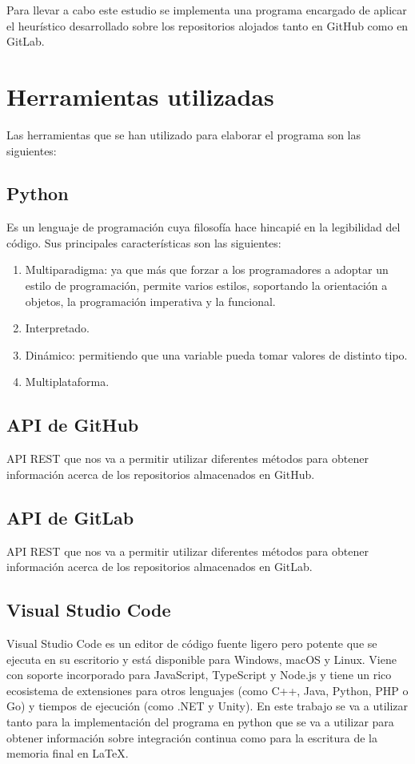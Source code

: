 Para llevar a cabo este estudio se implementa una programa encargado de aplicar el heurístico desarrollado sobre los repositorios alojados tanto en GitHub como en GitLab.

\section{Herramientas utilizadas}
Las herramientas que se han utilizado para elaborar el programa son las siguientes:
\subsection{Python}
Es un lenguaje de programación cuya filosofía hace hincapié en la legibilidad del código. Sus principales características son las siguientes:
\begin{enumerate}
    \item Multiparadigma: ya que más que forzar a los programadores a adoptar un estilo de programación, permite varios estilos, soportando la orientación a objetos, la programación imperativa y la funcional.
    \item Interpretado.
    \item Dinámico: permitiendo que una variable pueda tomar valores de distinto tipo.
    \item Multiplataforma.
\end{enumerate}

\subsection{API de GitHub}
API REST que nos va a permitir utilizar diferentes métodos para obtener información acerca de los repositorios almacenados en GitHub.

\subsection{API de GitLab}
API REST que nos va a permitir utilizar diferentes métodos para obtener información acerca de los repositorios almacenados en GitLab.

\subsection{Visual Studio Code}
Visual Studio Code es un editor de código fuente ligero pero potente que se ejecuta en su escritorio y está disponible para Windows, macOS y Linux. Viene con soporte incorporado para JavaScript, TypeScript y Node.js y tiene un rico ecosistema de extensiones para otros lenguajes  (como C++, Java, Python, PHP o Go) y tiempos de ejecución (como .NET y Unity).
En este trabajo se va a utilizar tanto para la implementación del programa en python que se va a utilizar para obtener información sobre integración continua como para la escritura de la memoria final en LaTeX.

